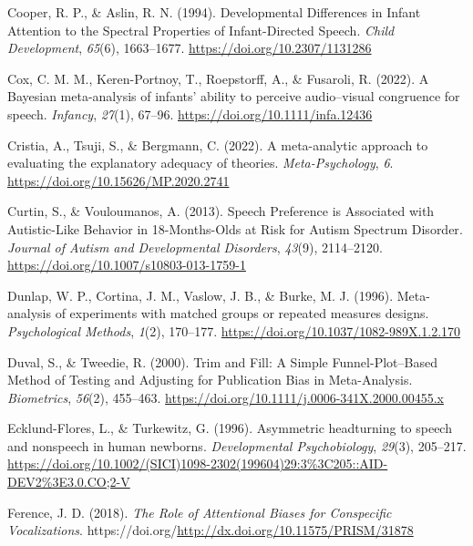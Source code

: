 \documentclass[
  man,mask,floatsintext]{apa6}
\newlength{\cslhangindent}
\newlength{\cslentryspacingunit} %
\newenvironment{CSLReferences}[2] %
 {%
  \setlength{\parindent}{0pt}
  \ifodd #1
  \let\oldpar\par
  \def\par{\hangindent=\cslhangindent\oldpar}
  \fi
  \setlength{\parskip}{#2\cslentryspacingunit}
 }%
 {}
\begin{document}
\begin{CSLReferences}{1}{0}
\leavevmode{}%
Cooper, R. P., \& Aslin, R. N. (1994). Developmental {Differences} in {Infant} {Attention} to the {Spectral} {Properties} of {Infant}-{Directed} {Speech}. \emph{Child Development}, \emph{65}(6), 1663--1677. \url{https://doi.org/10.2307/1131286}

\leavevmode{}%
Cox, C. M. M., Keren-Portnoy, T., Roepstorff, A., \& Fusaroli, R. (2022). A {Bayesian} meta-analysis of infants' ability to perceive audio--visual congruence for speech. \emph{Infancy}, \emph{27}(1), 67--96. \url{https://doi.org/10.1111/infa.12436}

\leavevmode{}%
Cristia, A., Tsuji, S., \& Bergmann, C. (2022). A meta-analytic approach to evaluating the explanatory adequacy of theories. \emph{Meta-Psychology}, \emph{6}. \url{https://doi.org/10.15626/MP.2020.2741}

\leavevmode{}%
Curtin, S., \& Vouloumanos, A. (2013). Speech {Preference} is {Associated} with {Autistic}-{Like} {Behavior} in 18-{Months}-{Olds} at {Risk} for {Autism} {Spectrum} {Disorder}. \emph{Journal of Autism and Developmental Disorders}, \emph{43}(9), 2114--2120. \url{https://doi.org/10.1007/s10803-013-1759-1}

\leavevmode{}%
Dunlap, W. P., Cortina, J. M., Vaslow, J. B., \& Burke, M. J. (1996). Meta-analysis of experiments with matched groups or repeated measures designs. \emph{Psychological Methods}, \emph{1}(2), 170--177. \url{https://doi.org/10.1037/1082-989X.1.2.170}

\leavevmode{}%
Duval, S., \& Tweedie, R. (2000). Trim and {Fill}: {A} {Simple} {Funnel}-{Plot}--{Based} {Method} of {Testing} and {Adjusting} for {Publication} {Bias} in {Meta}-{Analysis}. \emph{Biometrics}, \emph{56}(2), 455--463. \url{https://doi.org/10.1111/j.0006-341X.2000.00455.x}

\leavevmode{}%
Ecklund-Flores, L., \& Turkewitz, G. (1996). Asymmetric headturning to speech and nonspeech in human newborns. \emph{Developmental Psychobiology}, \emph{29}(3), 205--217. \url{https://doi.org/10.1002/(SICI)1098-2302(199604)29:3\%3C205::AID-DEV2\%3E3.0.CO;2-V}

\leavevmode{}%
Ference, J. D. (2018). \emph{The {Role} of {Attentional} {Biases} for {Conspecific} {Vocalizations}}. https://doi.org/\url{http://dx.doi.org/10.11575/PRISM/31878}


\end{CSLReferences}
\end{document}
